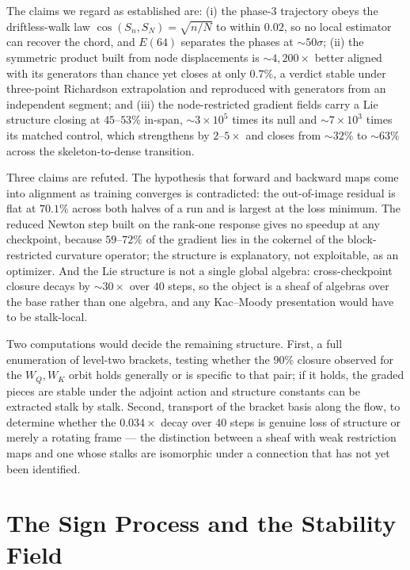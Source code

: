 The claims we regard as established are: (i) the phase-3 trajectory obeys the
driftless-walk law $\cos(S_n,S_N)=\sqrt{n/N}$ to within $0.02$, so no local
estimator can recover the chord, and $E(64)$ separates the phases at
$\sim\!50\sigma$; (ii) the symmetric product built from node displacements is
$\sim\!4{,}200\times$ better aligned with its generators than chance yet closes
at only $0.7\%$, a verdict stable under three-point Richardson extrapolation
and reproduced with generators from an independent segment; and (iii) the
node-restricted gradient fields carry a Lie structure closing at $45$--$53\%$
in-span, $\sim\!3\times10^{5}$ times its null and $\sim\!7\times10^{3}$ times
its matched control, which strengthens by $2$--$5\times$ and closes from
$\sim\!32\%$ to $\sim\!63\%$ across the skeleton-to-dense transition.

Three claims are refuted. The hypothesis that forward and backward maps come
into alignment as training converges is contradicted: the out-of-image residual
is flat at $70.1\%$ across both halves of a run and is largest at the loss
minimum. The reduced Newton step built on the rank-one response
gives no speedup at any checkpoint, because $59$--$72\%$ of the gradient lies
in the cokernel of the block-restricted curvature operator; the structure is
explanatory, not exploitable, as an optimizer. And the Lie structure is not a
single global algebra: cross-checkpoint closure decays by $\sim\!30\times$ over $40$ steps,
so the object is a sheaf of algebras over the base rather than one algebra,
and any Kac--Moody presentation would have to be stalk-local.

Two computations would decide the remaining structure. First, a full
enumeration of level-two brackets, testing whether the $90\%$ closure observed
for the $W_Q,W_K$ orbit holds generally or is specific to that pair; if it
holds, the graded pieces are stable under the adjoint action and structure
constants can be extracted stalk by stalk. Second, transport of the bracket
basis along the flow, to determine whether the $0.034\times$ decay over $40$
steps is genuine loss of structure or merely a rotating frame --- the
distinction between a sheaf with weak restriction maps and one whose stalks are
isomorphic under a connection that has not yet been identified.

\section{The Sign Process and the Stability Field}
\label{sec:sign-process}

